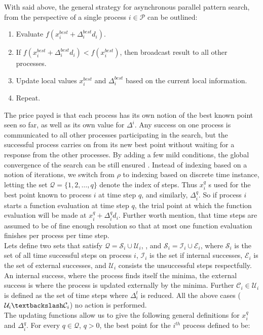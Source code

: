 {

 With said above, the general strategy for asynchronous parallel pattern search, from the perspective of a single process $i\in\mathcal{P}$ can be outlined:
		\begin{enumerate}
		\item Evaluate $f(x^{best}_i+\Delta^{best}_id_i)$.
		\item If $f(x^{best}_i+\Delta^{best}_id_i) <f(x^{best}_i)$, then broadcast result to all other processes.
		\item Update local values $x^{best}_i$ and $\Delta^{best}_i$ based on the current local information.
		\item Repeat.
		\end{enumerate}
	The price payed is that each process has its own notion of the best known point seen so far, as well as its own value for	$\Delta^i$. Any success on one process is communicated to all other processes participating in the search, but the successful process carries on from its new best point without waiting for a response from the other processes. By adding a few mild conditions, the global convergence of the search can be still ensured \cite{kolda2003understanding}.  Instead of indexing based on a notion of iterations, we switch from $\rho$ to indexing based on discrete time instance, letting the set $\mathcal{Q}=\{1,2,\dots,q\}$ denote the index of steps. Thus $x_i^q$ s used for the best point known to process $i$ at time step $q$, and similarly, $\Delta_i^q$.  So if process $i$ starts a function evaluation at time step $q$, the trial point at which the function evaluation will be made at $x^{q}_i+\Delta^{q}_id_i$. Further worth mention, that time steps are assumed to be of fine enough resolution so that at most one function evaluation finishes per process per time step.\\
	Lets define two sets that satisfy $\mathcal{Q}=\mathcal{S}_i\cup\mathcal{U}_i$, , and $\mathcal{S}_i=\mathcal{I}_i\cup\mathcal{E}_i$, where $\mathcal{S}_i$ is the set of all time successful steps on process $i$, $\mathcal{I}_i$ is the set if internal successes, $\mathcal{E}_i$ is the set of external successes,   and $\mathcal{U}_i$ consists the unsuccessful steps respectfully. An internal success, where the process finds itself the minima, the external success is where the process is updated externally by the minima. Further  $\mathcal{C}_i\in\mathcal{U}_i$ is defined as the set of time steps where $\Delta^t_i$ is reduced. All the above cases ($\mathcal{U}_i\textbackslash\mathcal{C}_i$) no action is performed.\\
	The updating functions allow us to give the following general definitions for $x_i^q$ and $\Delta^q_i$. For every $q\in\mathcal{Q}$, $q>0$, the best point for the $i^{th}$ process defined to be:
	
}
